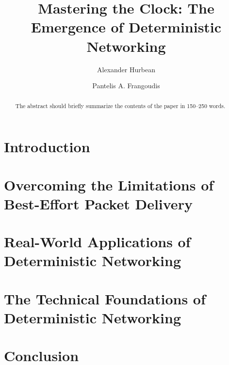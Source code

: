 \documentclass[runningheads]{llncs}
\begin{document}
\title{Mastering the Clock: The Emergence of Deterministic Networking}
\author{Alexander Hurbean \and
  Pantelis A. Frangoudis}

\maketitle              %

\begin{abstract}
  The abstract should briefly summarize the contents of the paper in
  150--250 words.
  
\end{abstract}

\section{Introduction}
\section{Overcoming the Limitations of Best-Effort Packet Delivery}
\section{Real-World Applications of Deterministic Networking}
\section{The Technical Foundations of Deterministic Networking}
\section{Conclusion}

\printnoidxglossary[type=acronym,sort=letter,title=Abbreviations]



\end{document}
